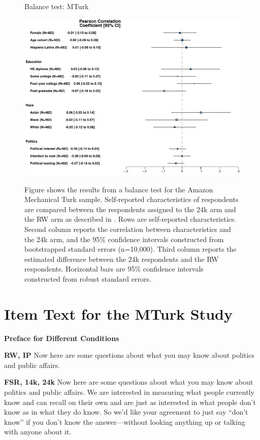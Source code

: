 \documentclass[12pt, letterpaper]{article}
\begin{document}
\begin{center}
\begin{figure}[H]
  \centering
  \caption{Balance test: MTurk}
  \includegraphics[scale=.8]{../figs/baltest-24k-rw.pdf}
  \label{fig:baltest-24k-rw}
  \caption*{\footnotesize Figure shows the results from a balance test for the Amazon Mechanical Turk sample. Self-reported characteristics of respondents are compared between the respondents assigned to the 24k arm and the RW arm as described in . 
  Rows are self-reported characteristics.
  Second column reports the correlation between characteristics and the 24k arm, and the 95\% confidence intervals constructed from bootstrapped standard errors (n=10,000).
  Third column reports the estimated difference between the 24k respondents and the RW respondents.
  Horizontal bars are 95\% confidence intervals constructed from robust standard errors.
  }
\end{figure}
\end{center}

\clearpage
\section{Item Text for the MTurk Study}\label{si:mturk}

\textbf{Preface for Different Conditions}

\textbf{RW, IP}\newline
Now here are some questions about what you may know about politics and public affairs.

\textbf{FSR, 14k, 24k}\newline
Now here are some questions about what you may know about politics and public affairs.
We are interested in measuring what people currently know and can recall on their own and are
just as interested in what people don't know as in what they do know. So we'd like your
agreement to just say ``don't know'' if you don't know the answer—without looking anything up
or talking with anyone about it.
\end{document}
